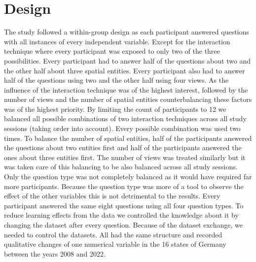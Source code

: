 \section{Design}
The study followed a within-group design as each participant answered questions with all instances of every independent variable. Except for the interaction technique where every participant was exposed to only two of the three possibilities. Every participant had to
answer half of the questions about two and the other half about three spatial entities. Every participant also had to answer half of the
questions using two and the other half using four views. As the influence of the interaction technique was of the highest interest, followed by
the number of views and the number of spatial entities counterbalancing these factors was of the highest priority. By limiting the count of
participants to 12 we balanced all possible combinations of two interaction techniques across all study sessions (taking order into
account). Every possible combination was used two times. To balance the number of spatial entities, half of the participants answered the
questions about two entities first and half of the participants answered the ones about three entities first. The number of views was
treated similarly but it was taken care of this balancing to be also balanced across all study sessions. Only the question type was not
completely balanced as it would have required far more participants. Because the question type was more of a tool to observe the effect of
the other variables this is not detrimental to the results. Every participant answered the same eight questions using all four question types. To reduce learning effects from the data we controlled the knowledge about it
by changing the dataset after every question. Because of the dataset exchange, we needed to control the datasets. All had the same
structure and recorded qualitative changes of one numerical variable in the 16 states of Germany between the years 2008 and 2022.
